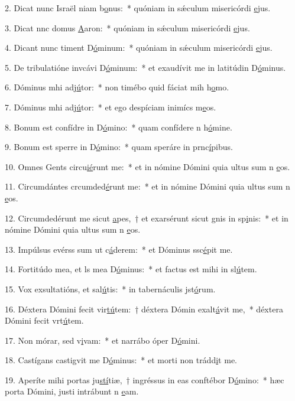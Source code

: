 2. Dicat nunc Israël niam b\uline{o}nus:~* quóniam in sǽculum misericórdi \uline{e}jus.\par 
3. Dicat nnc domus \uline{A}aron:~* quóniam in sǽculum misericórdi \uline{e}jus.\par 
4. Dicant nunc  timent D\uline{ó}minum:~* quóniam in sǽculum misericórdi \uline{e}jus.\par 
5. De tribulatióne invcávi D\uline{ó}minum:~* et exaudívit me in latitúdin D\uline{ó}minus.\par 
6. Dóminus mhi adj\uline{ú}tor:~* non timébo quid fáciat mih h\uline{o}mo.\par 
7. Dóminus mhi adj\uline{ú}tor:~* et ego despíciam inimícs m\uline{e}os.\par 
8. Bonum est confídre in D\uline{ó}mino:~* quam confídere n h\uline{ó}mine.\par 
9. Bonum est sperre in D\uline{ó}mino:~* quam speráre in prnc\uline{í}pibus.\par 
10. Omnes Gents circu\uline{ié}runt me:~* et in nómine Dómini quia ultus sum n \uline{e}os.\par 
11. Circumdántes crcumded\uline{é}runt me:~* et in nómine Dómini quia ultus sum n \uline{e}os.\par 
12. Circumdedérunt me sicut \uline{a}pes,~† et exarsérunt sicut gnis in sp\uline{i}nis:~* et in nómine Dómini quia ultus sum n \uline{e}os.\par 
13. Impúlsus evérss sum ut c\uline{á}derem:~* et Dóminus ssc\uline{é}pit me.\par 
14. Fortitúdo mea, et ls mea D\uline{ó}minus:~* et factus est mihi in sl\uline{ú}tem.\par 
15. Vox exsultatións, et sal\uline{ú}tis:~* in tabernáculis jst\uline{ó}rum.\par 
16. Déxtera Dómini fecit vir\uline{tú}tem:~† déxtera Dómin exalt\uline{á}vit me,~* déxtera Dómini fecit vrt\uline{ú}tem.\par 
17. Non mórar, sed v\uline{i}vam:~* et narrábo óper D\uline{ó}mini.\par 
18. Castígans castigvit me D\uline{ó}minus:~* et morti non trádd\uline{i}t me.\par 
19. Aperíte mihi portas ju\uline{stí}tiæ,~† ingréssus in eas conftébor D\uline{ó}mino:~* hæc porta Dómini, justi intrábunt n \uline{e}am.\par 
